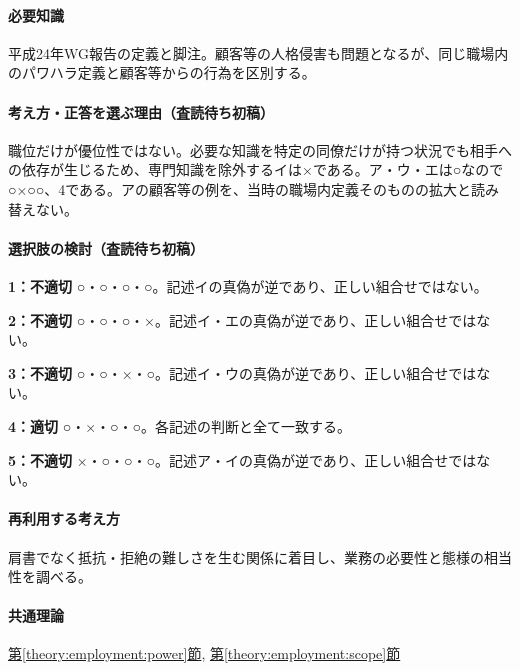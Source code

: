 \paragraph{必要知識} 平成24年WG報告の定義と脚注。顧客等の人格侵害も問題となるが、同じ職場内のパワハラ定義と顧客等からの行為を区別する。

\paragraph{考え方・正答を選ぶ理由（査読待ち初稿）} 職位だけが優位性ではない。必要な知識を特定の同僚だけが持つ状況でも相手への依存が生じるため、専門知識を除外するイは×である。ア・ウ・エは○なので○×○○、4である。アの顧客等の例を、当時の職場内定義そのものの拡大と読み替えない。

\paragraph{選択肢の検討（査読待ち初稿）}\mbox{}\par

\noindent\textbf{1：不適切} ○・○・○・○。記述イの真偽が逆であり、正しい組合せではない。\par

\noindent\textbf{2：不適切} ○・○・○・×。記述イ・エの真偽が逆であり、正しい組合せではない。\par

\noindent\textbf{3：不適切} ○・○・×・○。記述イ・ウの真偽が逆であり、正しい組合せではない。\par

\noindent\textbf{4：適切} ○・×・○・○。各記述の判断と全て一致する。\par

\noindent\textbf{5：不適切} ×・○・○・○。記述ア・イの真偽が逆であり、正しい組合せではない。\par

\paragraph{再利用する考え方} 肩書でなく抵抗・拒絶の難しさを生む関係に着目し、業務の必要性と態様の相当性を調べる。

\paragraph{共通理論} \hyperref[theory:employment:power]{第\ref*{theory:employment:power}節}, \hyperref[theory:employment:scope]{第\ref*{theory:employment:scope}節}

